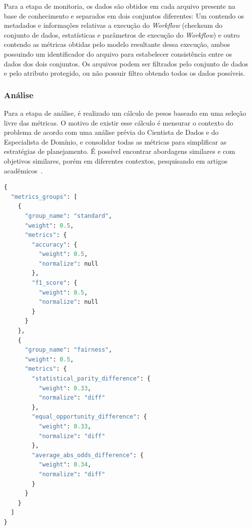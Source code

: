 \documentclass[portugues]{ic-tese}
\begin{document}
Para a etapa de monitoria, os dados são obtidos em cada arquivo presente na base de conhecimento e separados em dois conjuntos diferentes: Um contendo os metadados e informações relativas a execução do \textit{Workflow} (checksum do conjunto de dados, estatísticas e parâmetros de execução do \textit{Workflow}) e outro contendo as métricas obtidas pelo modelo resultante dessa execução, ambos possuindo um identificador do arquivo para estabelecer consistência entre os dados dos dois conjuntos. Os arquivos podem ser filtrados pelo conjunto de dados e pelo atributo protegido, ou não possuir filtro obtendo todos os dados possíveis.

\subsubsection{Análise}

Para a etapa de análise, é realizado um cálculo de pesos baseado em uma seleção livre das métricas. O motivo de existir esse cálculo é mensurar o contexto do problema de acordo com uma análise prévia do Cientista de Dados e do Especialista de Domínio, e consolidar todas as métricas para simplificar as estratégias de planejamento. É possível encontrar abordagens similares e com objetivos similares, porém em diferentes contextos, pesquisando em artigos acadêmicos~\citep{Konstantinou_2017}.

\begin{lstlisting}[language=Python, caption={Exemplo de arquivo contendo informações sobre as métricas, grupos e seus respectivos pesos},label=cod:MetricsWeights]
{
  "metrics_groups": [
    {
      "group_name": "standard",
      "weight": 0.5,
      "metrics": {
        "accuracy": {
          "weight": 0.5,
          "normalize": null
        },
        "f1_score": {
          "weight": 0.5,
          "normalize": null
        }
      }
    },
    {
      "group_name": "fairness",
      "weight": 0.5,
      "metrics": {
        "statistical_parity_difference": {
          "weight": 0.33,
          "normalize": "diff"
        },
        "equal_opportunity_difference": {
          "weight": 0.33,
          "normalize": "diff"
        },
        "average_abs_odds_difference": {
          "weight": 0.34,
          "normalize": "diff"
        }
      }
    }
  ]
}
\end{lstlisting}
\end{document}
